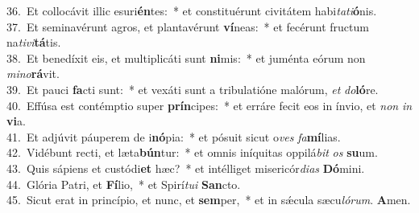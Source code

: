 {36.~}Et collocávit illic esuri\textbf{én}tes:~* et constituérunt civitátem habi\textit{ta}\textit{ti}\textbf{ó}nis.\\
{37.~}Et seminavérunt agros, et plantavérunt \textbf{ví}neas:~* et fecérunt fructum na\textit{ti}\textit{vi}\textbf{tá}tis.\\
{38.~}Et benedíxit eis, et multiplicáti sunt \textbf{ni}mis:~* et juménta eórum non \textit{mi}\textit{no}\textbf{rá}vit.\\
{39.~}Et pauci \textbf{fa}cti sunt:~* et vexáti sunt a tribulatióne malórum, \textit{et} \textit{do}\textbf{ló}re.\\
{40.~}Effúsa est contémptio super \textbf{prín}cipes:~* et erráre fecit eos in ínvio, et \textit{non} \textit{in} \textbf{vi}a.\\
{41.~}Et adjúvit páuperem de i\textbf{nó}pia:~* et pósuit sicut o\textit{ves} \textit{fa}\textbf{mí}lias.\\
{42.~}Vidébunt recti, et læta\textbf{bún}tur:~* et omnis iníquitas oppilá\textit{bit} \textit{os} \textbf{su}um.\\
{43.~}Quis sápiens et custódi\textbf{et} hæc?~* et intélliget misericór\textit{di}\textit{as} \textbf{Dó}mini.\\
{44.~}Glória Patri, et \textbf{Fí}lio,~* et Spirí\textit{tu}\textit{i} \textbf{San}cto.\\
{45.~}Sicut erat in princípio, et nunc, et \textbf{sem}per,~* et in sǽcula sæcu\textit{ló}\textit{rum}. \textbf{A}men.\\
